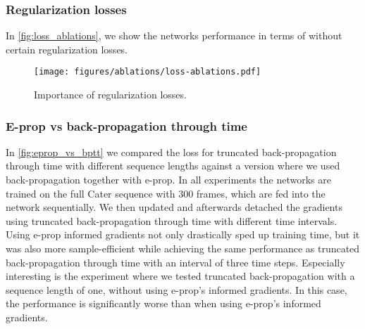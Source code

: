 \documentclass{article} \usepackage{iclr2023_conference_arxiv,times}
\begin{document}
\subsubsection{Regularization losses}

In \autoref{fig:loss_ablations}, we show the networks performance in terms of  without certain regularization losses.

\begin{figure}
  \texttt{[image: figures/ablations/loss-ablations.pdf]}
    \vspace{-.75cm}
  \caption{Importance of regularization losses.}
  \label{fig:loss_ablations}
\end{figure}


\subsubsection{E-prop vs back-propagation through time}
\label{sec:eprop_vs_backprop}
In \autoref{fig:eprop_vs_bptt} we compared the  loss for truncated back-propagation through time with different sequence lengths against a version where we used back-propagation together with e-prop. In all experiments the networks are trained on the full Cater sequence with 300 frames, which are fed into the network sequentially. We then updated and afterwards detached the gradients using truncated back-propagation through time with different time intervals.  
Using e-prop informed gradients not only drastically sped up training time, but it was also more sample-efficient while achieving the same performance as truncated back-propagation through time with an interval of three time steps. Especially interesting is the experiment where we tested truncated back-propagation with a sequence length of one, without using e-prop's informed gradients. In this case, the performance is significantly worse than when using e-prop's informed gradients.
\end{document}
